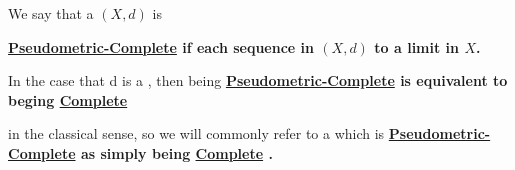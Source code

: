 \label{def:pseudometriccomplete}
\newcommand{\PseudometricComplete}[0]{
    \bf \hyperref[def:pseudometriccomplete]{Pseudometric-Complete} \rm
}
\newcommand{\Complete}[0]{
    \bf \hyperref[def:pseudometriccomplete]{Complete} \rm
}
\begin{df}
    We say that a \PseudometricSpace $(X,d)$ is 
    \PseudometricComplete if each 
	\PseudometricCauchySequence 
	sequence in $(X,d)$ 
	\PseudometricConverges to a limit in $X$.


	In the case that d is a \Metric, then
	being \PseudometricComplete is 
	equivalent to beging \Complete
	in the classical sense, so 
	we will commonly refer to a \PseudometricSpace
	which is \PseudometricComplete as simply
	being \Complete. 
    \end{df}